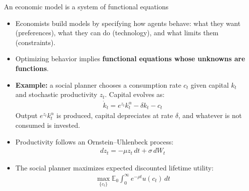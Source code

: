 \documentclass[aspectratio=169,10pt]{beamer}
\newcommand{\emphcolor}[1]{\textbf{\textcolor{emphcolorval}{#1}}}
\begin{document}
\begin{frame}{An economic model is a system of functional equations}
	\begin{itemize}
		\item Economists build models by specifying how agents behave: what they want (preferences), what they can do (technology), and what limits them (constraints).
		\vspace{0.1in}
		\item Optimizing behavior implies \emphcolor{functional equations whose unknowns are functions}.
		\vspace{0.1in}
		\item \emphcolor{Example:} a social planner chooses a consumption rate $c_t$ given capital $k_t$ and stochastic productivity $z_t$. Capital evolves as:
		\begin{align*}
			\dot{k}_t = e^{z_t} k_t^{\alpha} - \delta k_t - c_t
		\end{align*}
		Output $e^{z_t} k_t^\alpha$ is produced, capital depreciates at rate $\delta$, and whatever is not consumed is invested.
		\vspace{0.05in}
		\item Productivity follows an Ornstein--Uhlenbeck process:
		\begin{align*}
			dz_t = -\mu z_t\, dt + \sigma\, dW_t
		\end{align*}
		\item The social planner maximizes expected discounted lifetime utility:
		\begin{align*}
			\max_{\{c_t\}} \mathbb{E}_0 \int_0^\infty e^{-\rho t} u(c_t)\, dt
		\end{align*}
	\end{itemize}
\end{frame}
\end{document}
